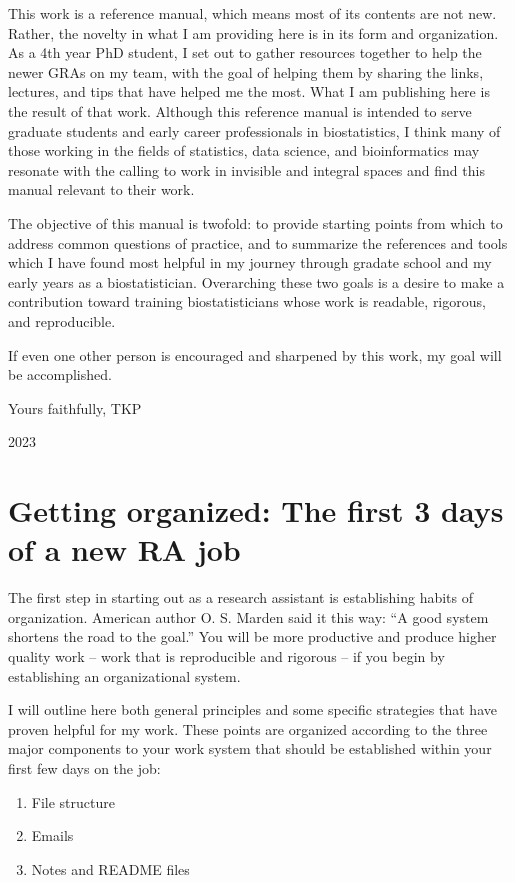 \documentclass[
]{book}
\begin{document}
This work is a reference manual, which means most of its contents are not new. Rather, the novelty in what I am providing here is in its form and organization. As a 4th year PhD student, I set out to gather resources together to help the newer GRAs on my team, with the goal of helping them by sharing the links, lectures, and tips that have helped me the most. What I am publishing here is the result of that work. Although this reference manual is intended to serve graduate students and early career professionals in biostatistics, I think many of those working in the fields of statistics, data science, and bioinformatics may resonate with the calling to work in invisible and integral spaces and find this manual relevant to their work.

The objective of this manual is twofold: to provide starting points from which to address common questions of practice, and to summarize the references and tools which I have found most helpful in my journey through gradate school and my early years as a biostatistician. Overarching these two goals is a desire to make a contribution toward training biostatisticians whose work is readable, rigorous, and reproducible.

If even one other person is encouraged and sharpened by this work, my goal will be accomplished.

Yours faithfully,
TKP

2023

\hypertarget{getting-organized-the-first-3-days-of-a-new-ra-job}{%
\chapter{Getting organized: The first 3 days of a new RA job}\label{getting-organized-the-first-3-days-of-a-new-ra-job}}

The first step in starting out as a research assistant is establishing habits of organization. American author O. S. Marden said it this way: ``A good system shortens the road to the goal.'' You will be more productive and produce higher quality work -- work that is reproducible and rigorous -- if you begin by establishing an organizational system.

I will outline here both general principles and some specific strategies that have proven helpful for my work. These points are organized according to the three major components to your work system that should be established within your first few days on the job:

\begin{enumerate}
\def\labelenumi{\arabic{enumi}.}
\item
  File structure
\item
  Emails
\item
  Notes and README files
\end{enumerate}
\end{document}
